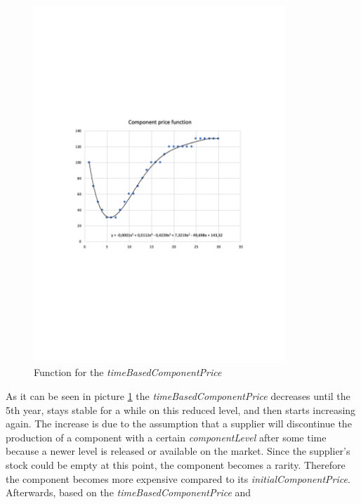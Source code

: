 
\begin{figure}
    \centering
	\includegraphics[width=9.5cm]{images/timeBasedComponentPriceFunction.pdf}
	\caption{Function for the \textit{timeBasedComponentPrice}}
	\label{img:timeBasedComponentPriceFunction}
\end{figure}
As it can be seen in picture \ref{img:timeBasedComponentPriceFunction} the \textit{timeBasedComponentPrice} decreases until the 5th year, stays stable for a while on this reduced level, and then starts increasing again. The increase is due to the assumption that a supplier will discontinue the production of a component with a certain \textit{componentLevel} after some time because a newer level is released or available on the market. Since the supplier’s stock could be empty at this point, the component becomes a rarity. Therefore the component becomes more expensive compared to its \textit{initialComponentPrice}.\\
Afterwards, based on the \textit{timeBasedComponentPrice} and
